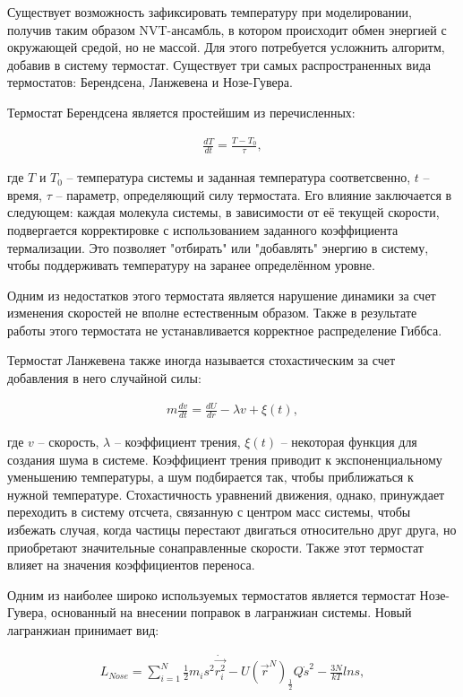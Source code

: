 Существует возможность зафиксировать температуру при моделировании, получив таким образом NVT-ансамбль, в котором происходит обмен энергией с окружающей средой, но не массой. Для этого потребуется усложнить алгоритм, добавив в систему термостат. Существует три самых распространенных вида термостатов: Берендсена, Ланжевена и Нозе-Гувера.

Термостат Берендсена является простейшим из перечисленных:

\begin{align}
    \frac{dT}{dt} = \frac{T-T_0}{\tau},
\end{align}

где $T$ и $T_0$ \--- температура системы и заданная температура соответсвенно, $t$ \--- время, $\tau$ \--- параметр, определяющий силу термостата. Его влияние заключается в следующем: каждая молекула системы, в зависимости от её текущей скорости, подвергается корректировке с использованием заданного коэффициента термализации. Это позволяет "отбирать" или "добавлять" энергию в систему, чтобы поддерживать температуру на заранее определённом уровне. 

Одним из недостатков этого термостата является нарушение динамики за счет изменения скоростей не вполне естественным образом. Также в результате работы этого термостата не устанавливается корректное распределение Гиббса.

Термостат Ланжевена также иногда называется стохастическим за счет добавления в него случайной силы:

\begin{align}
    m\frac{dv}{dt} = \frac{dU}{dr} - \lambda v + \xi(t),
\end{align}

где $v$ \--- скорость, $\lambda$ \--- коэффициент трения, $\xi(t)$ \--- некоторая функция для создания шума в системе. Коэффициент трения приводит к экспоненциальному уменьшению температуры, а шум подбирается так, чтобы приближаться к нужной температуре. Стохастичность уравнений движения, однако, принуждает переходить в систему отсчета, связанную с центром масс системы, чтобы избежать случая, когда частицы перестают двигаться относительно друг друга, но приобретают значительные сонаправленные скорости. Также этот термостат влияет на значения коэффициентов переноса.

Одним из наиболее широко используемых термостатов является термостат Нозе-Гувера, основанный на внесении поправок в лагранжиан системы. Новый лагранжиан принимает вид:

\begin{align}
    L_{Nose} = \sum_{i=1}^{N} \frac{1}{2} m_i s^2 \dot{\vec{r_i^2}} - U(\vec{r}^N) _ \frac{1}{2}Q \dot{s}^2 - \frac{3N}{kT} ln s,
\end{align}

